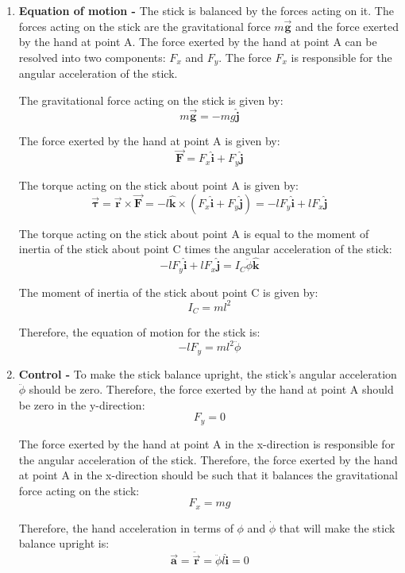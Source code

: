 \begin{enumerate}[label = (\alph*)]
    \item \textbf{Equation of motion -} The stick is balanced by the forces acting on it.
          The forces acting on the stick are the gravitational force \( m\vec{\mathbf{g}} \) and the force exerted by the hand at point A.
          The force exerted by the hand at point A can be resolved into two components: \( F_x \) and \( F_y \).
          The force \( F_x \) is responsible for the angular acceleration of the stick.

          The gravitational force acting on the stick is given by:
          \[
              m\vec{\mathbf{g}} = -mg\hat{\mathbf{j}}
          \]

          The force exerted by the hand at point A is given by:
          \[
              \vec{\mathbf{F}} = F_x\hat{\mathbf{i}} + F_y\hat{\mathbf{j}}
          \]

          The torque acting on the stick about point A is given by:
          \[
              \vec{\mathbf{\tau}} = \vec{\mathbf{r}} \times \vec{\mathbf{F}} = -l\hat{\mathbf{k}} \times (F_x\hat{\mathbf{i}} + F_y\hat{\mathbf{j}}) = -lF_y\hat{\mathbf{i}} + lF_x\hat{\mathbf{j}}
          \]

          The torque acting on the stick about point A is equal to the moment of inertia of the stick about point C times the angular acceleration of the stick:
          \[
              -lF_y\hat{\mathbf{i}} + lF_x\hat{\mathbf{j}} = I_C\ddot{\phi}\hat{\mathbf{k}}
          \]

          The moment of inertia of the stick about point C is given by:
          \[
              I_C = ml^2
          \]

          Therefore, the equation of motion for the stick is:
          \[
              -lF_y = ml^2\ddot{\phi}
          \]

    \item \textbf{Control -} To make the stick balance upright, the stick's angular acceleration \( \ddot{\phi} \) should be zero.
          Therefore, the force exerted by the hand at
          point A should be zero in the y-direction:
          \[
              F_y = 0
          \]

          The force exerted by the hand at point A in the x-direction is responsible for the angular acceleration of the stick.
          Therefore, the force exerted by the hand at point A in the x-direction should be such that it balances the gravitational force acting on the stick:
          \[
              F_x = mg
          \]

          Therefore, the hand acceleration in terms of \( \phi \) and \( \dot\phi \) that will make the stick balance upright is:
          \[
              \vec{\mathbf{a}} = \ddot{\vec{\mathbf{r}}} = \ddot{\phi}l\hat{\mathbf{i}} = 0
          \]
\end{enumerate}
